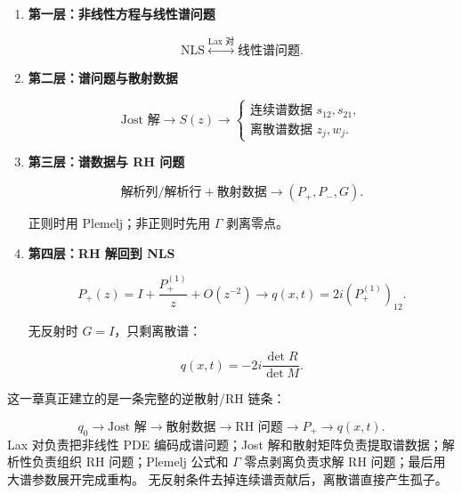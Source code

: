 \documentclass[
    lang=cn,
    scheme=chinese,
    mode=simple,
    device=normal,
    color=blue,
    math=cm,
    thmcnt=section,
    12pt
]{elegantbook}
\begin{document}
\begin{enumerate}
    \item \textbf{第一层：非线性方程与线性谱问题}

          \[
              \text{NLS}
              \overset{\text{Lax 对}}{\longleftrightarrow}
              \text{线性谱问题}.
          \]

    \item \textbf{第二层：谱问题与散射数据}

          \[
              \text{Jost 解}
              \longrightarrow
              S(z)
              \longrightarrow
              \begin{cases}
                  \text{连续谱数据 }s_{12},s_{21}, \\
                  \text{离散谱数据 }z_j,w_j.
              \end{cases}
          \]

    \item \textbf{第三层：谱数据与 RH 问题}

          \[
              \text{解析列/解析行}
              +
              \text{散射数据}
              \longrightarrow
              (P_+,P_-,G).
          \]

          正则时用 Plemelj；非正则时先用 $\Gamma$ 剥离零点。

    \item \textbf{第四层：RH 解回到 NLS}

          \[
              P_+(z)
              =
              I+\dfrac{P_+^{(1)}}{z}+O(z^{-2})
              \longrightarrow
              q(x,t)=2i(P_+^{(1)})_{12}.
          \]

          无反射时 $G=I$，只剩离散谱：

          \[
              q(x,t)
              =
              -2i\dfrac{\det R}{\det M}.
          \]
\end{enumerate}

\begin{callout}[组会最后一句]
    这一章真正建立的是一条完整的逆散射/RH 链条：

    \[
        \boxed{
            q_0
            \longrightarrow
            \text{Jost 解}
            \longrightarrow
            \text{散射数据}
            \longrightarrow
            \text{RH 问题}
            \longrightarrow
            P_+
            \longrightarrow
            q(x,t).
        }
    \]
    Lax 对负责把非线性 PDE 编码成谱问题；Jost 解和散射矩阵负责提取谱数据；解析性负责组织 RH 问题；Plemelj 公式和 $\Gamma$ 零点剥离负责求解 RH 问题；最后用大谱参数展开完成重构。
    无反射条件去掉连续谱贡献后，离散谱直接产生孤子。
\end{callout}
\end{document}
